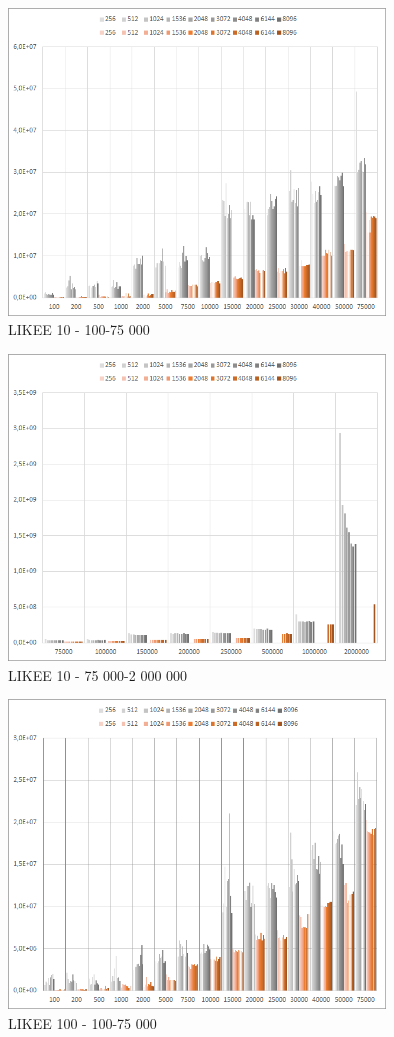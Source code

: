 \documentclass[a4paper, 11pt]{article}
\begin{document}
\begin{figure}[H]
\centering
\includegraphics[width=100mm]{images/n10-100-75k.png}
\caption{LIKEE 10 - 100-75 000}
\end{figure}
\begin{figure}[H]
\centering
\includegraphics[width=100mm]{images/n10-75k-2kk.png}
\caption{LIKEE 10 - 75 000-2 000 000}
\end{figure}
\begin{figure}[H]
\centering
\includegraphics[width=100mm]{images/n100-100-75k.png}
\caption{LIKEE 100 - 100-75 000}
\end{figure}
\end{document}
